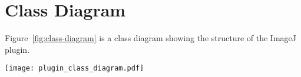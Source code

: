 
\section{Class Diagram}
\label{sec:class_diagram}

Figure~\ref{fig:class-diagram} is a class diagram showing the structure of the
ImageJ plugin.

\texttt{[image: plugin\_class\_diagram.pdf]}\label{fig:class-diagram}
